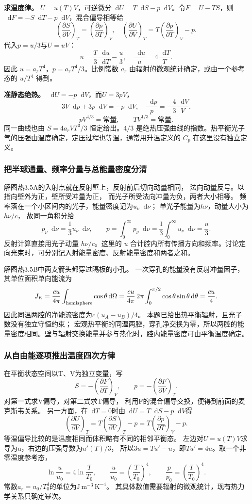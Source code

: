 \documentclass[UTF8,fontset=fandol,a4paper,11pt]{ctexart}
\newcommand{\dd}{\mathop{}\!\mathrm{d}}
\newcommand{\result}[1]{\begin{equation*}\boxed{#1}\end{equation*}}
\begin{document}
\textbf{求温度律。} $U=u(T)V$，可逆微分$\dd U=T\dd S-p\dd V$。令$F=U-TS$，则$\dd F=-S\dd T-p\dd V$，混合偏导相等给
\[\left(\frac{\partial S}{\partial V}\right)_T=\left(\frac{\partial p}{\partial T}\right)_V,\quad
\left(\frac{\partial U}{\partial V}\right)_T=T\left(\frac{\partial p}{\partial T}\right)_V-p.\]
代入$p=u/3$与$U=uV$：
\[u=\frac T3\frac{\dd u}{\dd T}-\frac u3,
\quad\frac{\dd u}{u}=4\frac{\dd T}{T}.
\]
因此 $u=a_rT^4$，$p=a_rT^4/3$。比例常数 $a_r$ 由辐射的微观统计确定，或由一个参考态的 $u/T^4$ 得到。

\textbf{准静态绝热。} $\dd U=-p\dd V$，而$U=3pV$，
\[3V\dd p+3p\dd V=-p\dd V,
\quad\frac{\dd p}{p}=-\frac43\frac{\dd V}{V}.\]
\result{pV^{4/3}=\text{常量},\qquad TV^{1/3}=\text{常量}.}
同一曲线也由 $S=4a_rVT^3/3$ 恒定给出。$4/3$ 是绝热压强曲线的指数。热平衡光子气的压强由温度确定，定压过程也等温，通常用升温定义的 $C_p$ 在这里没有独立定义。
\subsubsection*{把半球通量、频率分量与总能量密度分清}
解图热3.5A的入射点就在反射壁上，反射前后切向动量相同，
法向动量反号。以指向壁外为正，壁所受冲量为正，
而光子所受法向冲量为负，两者大小相等。
频率落在一个小区间内的光子，能量密度记为$u_\nu\dd\nu$；
单光子能量为$h\nu$，动量大小为$h\nu/c$，
故同一角积分给
\[
p_\nu\dd\nu=\frac13u_\nu\dd\nu,\qquad
p=\int_0^\infty p_\nu\dd\nu
=\frac13\int_0^\infty u_\nu\dd\nu=\frac u3.
\]
反射计算直接用光子动量 $h\nu/c$。这里的 $u$ 合计腔内所有传播方向和频率。讨论定向光束时，可分别记入射能量密度、反射能量密度和两者之和。

解图热3.5B中两支箭头都穿过隔板的小孔。
一次穿孔的能量没有反射冲量因子，其单位面积单向能流为
\[
J_E=\frac{cu}{4\pi}\int_{\rm hemisphere}\cos\theta\dd\Omega
=\frac{cu}{4\pi}\,2\pi\int_0^{\pi/2}\cos\theta\sin\theta\dd\theta
=\frac{cu}{4}.
\]
因此同温两腔的净能流密度为$c(u_A-u_B)/4$。
本题已给出热平衡辐射，且光子数没有独立守恒约束；
宏观热平衡的同温两腔，穿孔净交换为零，所以两腔的能量密度相同。壁与辐射交换能量并参与热化时，腔内能量密度可由平衡温度确定。

\subsubsection*{从自由能逐项推出温度四次方律}
在平衡状态空间以T、V为独立变量，写
\[
S=-\left(\frac{\partial F}{\partial T}\right)_V,\qquad
p=-\left(\frac{\partial F}{\partial V}\right)_T.
\]
对第一式求V偏导，对第二式求T偏导，
利用F的混合偏导交换，便得到前面的麦克斯韦关系。
另一方面，在$\dd T=0$时由$\dd U=T\dd S-p\dd V$得
\[
\left(\frac{\partial U}{\partial V}\right)_T
=T\left(\frac{\partial S}{\partial V}\right)_T-p
=T\left(\frac{\partial p}{\partial T}\right)_V-p.
\]
等温偏导比较的是温度相同而体积略有不同的相邻平衡态。
左边对$U=u(T)V$求导为u，右边的压强导数为$u'(T)/3$，
所以$3u=Tu'-u$，即$Tu'=4u$。取一个非零温度参考态，
\[
\ln\frac{u}{u_0}=4\ln\frac{T}{T_0},\qquad
\frac{u}{u_0}=\left(\frac{T}{T_0}\right)^4,\qquad
\frac{p}{p_0}=\left(\frac{T}{T_0}\right)^4.
\]
常数$a_r=u_0/T_0^4$的单位为$\mathrm{J\,m^{-3}\,K^{-4}}$。
其具体数值需要辐射的微观统计，现有热力学关系只确定幂次。
\end{document}
